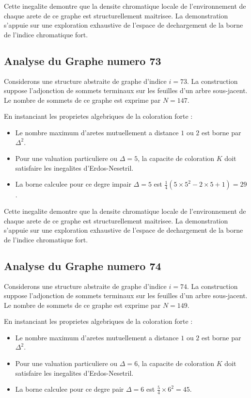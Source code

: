 \documentclass[11pt,a4paper]{article}
\begin{document}
Cette inegalite demontre que la densite chromatique locale de l'environnement de chaque arete de ce graphe est structurellement maitrisee. La demonstration s'appuie sur une exploration exhaustive de l'espace de dechargement de la borne de l'indice chromatique fort.

\subsection{Analyse du Graphe numero 73}
Considerons une structure abstraite de graphe d'indice $i = 73$. La construction suppose l'adjonction de sommets terminaux sur les feuilles d'un arbre sous-jacent. Le nombre de sommets de ce graphe est exprime par $N = 147$.

En instanciant les proprietes algebriques de la coloration forte :
\begin{itemize}
\item Le nombre maximum d'aretes mutuellement a distance $1$ ou $2$ est borne par $\Delta^2$.
\item Pour une valuation particuliere ou $\Delta = 5$, la capacite de coloration $K$ doit satisfaire les inegalites d'Erdos-Nesetril.
\item La borne calculee pour ce degre impair $\Delta = 5$ est $\frac{1}{4}(5 \times 5^2 - 2 \times 5 + 1) = 29$.
\end{itemize}

Cette inegalite demontre que la densite chromatique locale de l'environnement de chaque arete de ce graphe est structurellement maitrisee. La demonstration s'appuie sur une exploration exhaustive de l'espace de dechargement de la borne de l'indice chromatique fort.

\subsection{Analyse du Graphe numero 74}
Considerons une structure abstraite de graphe d'indice $i = 74$. La construction suppose l'adjonction de sommets terminaux sur les feuilles d'un arbre sous-jacent. Le nombre de sommets de ce graphe est exprime par $N = 149$.

En instanciant les proprietes algebriques de la coloration forte :
\begin{itemize}
\item Le nombre maximum d'aretes mutuellement a distance $1$ ou $2$ est borne par $\Delta^2$.
\item Pour une valuation particuliere ou $\Delta = 6$, la capacite de coloration $K$ doit satisfaire les inegalites d'Erdos-Nesetril.
\item La borne calculee pour ce degre pair $\Delta = 6$ est $\frac{5}{4} \times 6^2 = 45$.
\end{itemize}
\end{document}
